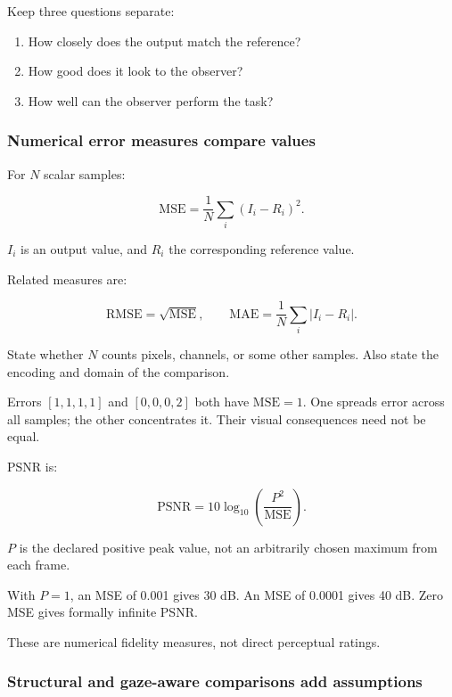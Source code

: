 Keep three questions separate:

\begin{enumerate}
\def\labelenumi{\arabic{enumi}.}
\tightlist
\item
  How closely does the output match the reference?
\item
  How good does it look to the observer?
\item
  How well can the observer perform the task?
\end{enumerate}

\subsubsection{Numerical error measures compare values}\label{04-visual-computing-ii-ch043-numerical-error-measures-compare-values}

\hypertarget{04-visual-computing-ii-ch043-numerical-error-measures-compare-values}{}

For \(N\) scalar samples:

\[
\mathrm{MSE}=\frac1N\sum_i(I_i-R_i)^2.
\]

\(I_i\) is an output value, and \(R_i\) the corresponding reference value.

Related measures are:

\[
\mathrm{RMSE}=\sqrt{\mathrm{MSE}},
\qquad
\mathrm{MAE}=\frac1N\sum_i|I_i-R_i|.
\]

State whether \(N\) counts pixels, channels, or some other samples. Also state the encoding and domain of the comparison.

Errors \([1,1,1,1]\) and \([0,0,0,2]\) both have \(\mathrm{MSE}=1\). One spreads error across all samples; the other concentrates it. Their visual consequences need not be equal.

PSNR is:

\[
\mathrm{PSNR}
=10\log_{10}\left(\frac{P^2}{\mathrm{MSE}}\right).
\]

\(P\) is the declared positive peak value, not an arbitrarily chosen maximum from each frame.

With \(P=1\), an MSE of 0.001 gives 30 dB. An MSE of 0.0001 gives 40 dB. Zero MSE gives formally infinite PSNR.

These are numerical fidelity measures, not direct perceptual ratings.

\subsubsection{Structural and gaze-aware comparisons add assumptions}\label{04-visual-computing-ii-ch043-structural-and-gaze-aware-comparisons-add-assumptions}

